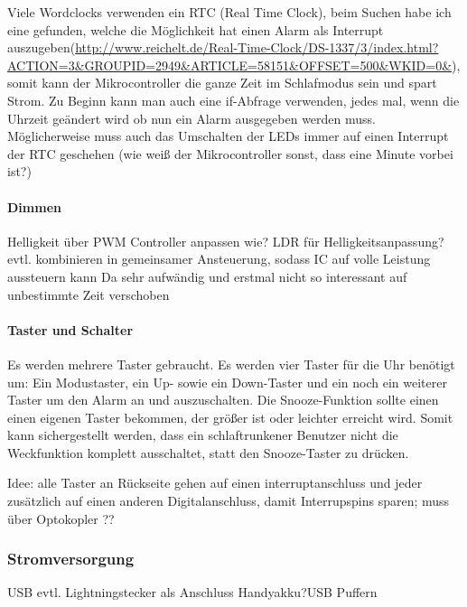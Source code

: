 \documentclass[11pt,a4paper,ngerman]{article}
\begin{document}
Viele Wordclocks verwenden ein RTC (Real Time Clock), beim Suchen habe ich eine gefunden, welche die Möglichkeit hat einen Alarm als Interrupt auszugeben(\url{http://www.reichelt.de/Real-Time-Clock/DS-1337/3/index.html?ACTION=3&GROUPID=2949&ARTICLE=58151&OFFSET=500&WKID=0&}), somit kann der Mikrocontroller die ganze Zeit im Schlafmodus sein und spart Strom. Zu Beginn kann man auch eine if-Abfrage verwenden, jedes mal, wenn die Uhrzeit geändert wird ob nun ein Alarm ausgegeben werden muss. Möglicherweise muss auch das Umschalten der LEDs immer auf einen Interrupt der RTC geschehen (wie weiß der Mikrocontroller sonst, dass eine Minute vorbei ist?)


\paragraph{Dimmen}
Helligkeit über PWM Controller anpassen wie?
LDR für Helligkeitsanpassung? evtl. kombinieren in gemeinsamer Ansteuerung, sodass IC auf volle Leistung aussteuern kann
Da sehr aufwändig und erstmal nicht so interessant auf unbestimmte Zeit verschoben
\paragraph{Taster und Schalter}
Es werden mehrere Taster gebraucht. Es werden vier Taster für die Uhr benötigt um: Ein Modustaster, ein Up- sowie ein Down-Taster und ein noch ein weiterer Taster um den Alarm an und auszuschalten. Die Snooze-Funktion sollte einen einen eigenen Taster bekommen, der größer ist oder leichter erreicht wird. Somit kann sichergestellt werden, dass ein schlaftrunkener Benutzer nicht die Weckfunktion komplett ausschaltet, statt den Snooze-Taster zu drücken.

Idee: alle Taster an Rückseite gehen auf einen interruptanschluss und jeder zusätzlich auf einen anderen Digitalanschluss, damit Interrupspins sparen; muss über Optokopler ??
\subsubsection{Stromversorgung}
USB evtl. Lightningstecker als Anschluss       
Handyakku?USB Puffern\cite{RTCDatenblatt}


\end{document}
